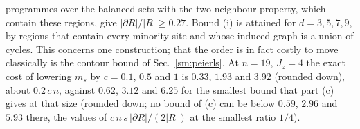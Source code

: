 \documentclass[aps,prx,onecolumn,10pt,nofootinbib,longbibliography,floatfix]{revtex4-2}
\theoremstyle{remark}
\newcommand{\Jz}{J_z}
\newcommand{\ms}{m_s}
\begin{document}
programmes over the balanced sets with the two-neighbour property, which contain these regions, give
$|\partial R|/|R|\ge0.27$. Bound (i) is attained for $d=3,5,7,9$, by regions that contain every minority site and %
whose induced graph is a union of cycles. This concerns one construction; that the order is in fact costly to move %
classically is the contour bound of Sec.~\ref{sm:peierls}. At $n=19$, $\Jz=4$ the exact cost of lowering $\ms$ by
$c=0.1$, $0.5$ and $1$ is $0.33$, $1.93$ and $3.92$ (rounded down), about $0.2\,c\,n$, against $0.62$, $3.12$ and %
$6.25$ for the smallest bound that part (c) gives at that size (rounded down; no bound of (c) can be below %
$0.59$, $2.96$ and $5.93$ there, the values of $c\,n\,s\,|\partial R|/(2|R|)$ at the smallest ratio $1/4$). %
\end{document}
